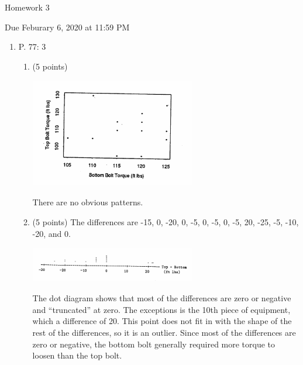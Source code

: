 \documentclass{article}
\begin{document}
\begin{center} \LARGE
Homework 3 
\end{center}
\begin{center} \Large
Due Feburary 6, 2020 at 11:59 PM 
\end{center}



\begin{enumerate}
	\item P. 77: 3 
	\begin{enumerate}
		\item (5 points)
			\begin{center}
				\includegraphics[width=0.6\textwidth]{./hw3_1_a.png}
			\end{center}
			{\color{red} There are no obvious patterns.}
		\item (5 points)
			{\color{red} The differences are -15, 0, -20, 0, -5, 0, -5, 0, -5,
			20, -25, -5, -10, -20, and 0.}

			\begin{center}
				\includegraphics[width=0.6\textwidth]{./hw3_1_b.png}
			\end{center}

			{\color{red} 
			The dot diagram shows that most of the differences are
			zero or negative and ``truncated'' at zero. The
			exceptions is the 10th piece of equipment, which a
			difference of 20. This point does not fit in with the
			shape of the rest of the differences, so it is an
			outlier. Since most of the differences are zero or
			negative, the bottom bolt generally required more
			torque to loosen than the top bolt.
			}



\end{enumerate}
\end{enumerate}
\end{document}
